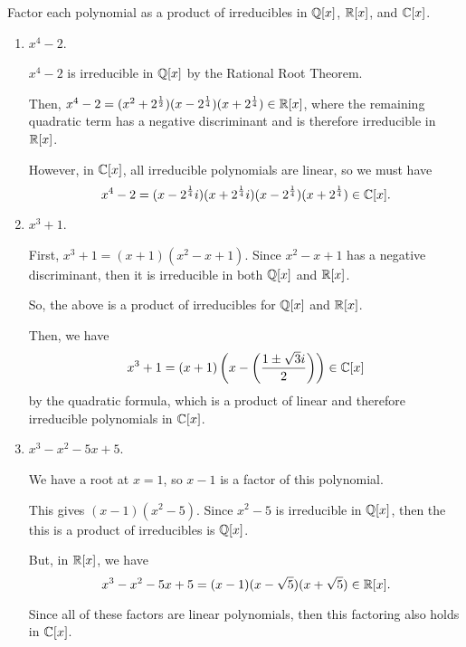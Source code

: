 \documentclass[../hw6]{subfiles}
\begin{document}
\begin{problem}
Factor each polynomial as a product of irreducibles in $\mathbb{Q}[x]$, $\mathbb{R}[x]$, and $\mathbb{C}[x]$.
\end{problem}
\begin{enumerate}[label=\alph*)]
	\item $x^4-2$.

	      $x^4-2$ is irreducible in  $\mathbb{Q}[x]$ by the Rational Root Theorem.

	      Then, $x^4-2=(x^2+2^{\frac{1}{2}})(x-2^{\frac{1}{4}})(x+2^{\frac{1}{4}}) \in \mathbb{R}[x]$,
	      where the remaining quadratic term has a negative discriminant and is therefore irreducible in $\mathbb{R}[x]$.

	      However, in $\mathbb{C}[x]$, all irreducible polynomials are linear, so we must have \[
		      x^4-2=(x-2^{\frac{1}{4}}i)(x+2^{\frac{1}{4}}i)(x-2^{\frac{1}{4}})(x+2^{\frac{1}{4}}) \in  \mathbb{C}[x]
		      .\]

	\item $x^3+1$.

	      First, $x^3+1=(x+1)(x^2-x+1)$. Since $x^2-x+1$ has a negative discriminant, then it is irreducible in both $\mathbb{Q}[x]$ and $\mathbb{R}[x]$.

	      So, the above is a product of irreducibles for $\mathbb{Q}[x]$ and $\mathbb{R}[x]$.

	      Then, we have \[
		      x^3+1 = (x+1)\left( x- \left( \frac{1 \pm \sqrt{3}i }{2} \right)  \right) \in \mathbb{C}[x]
	      \] by the quadratic formula, which is a product of linear and therefore irreducible polynomials in $\mathbb{C}[x]$.

	\item $x^3 - x^2 - 5x + 5$.

	      We have a root at $x=1$, so  $x-1$ is a factor of this polynomial.

	      This gives $(x-1)(x^2-5)$.
	      Since $x^2-5$ is irreducible in $\mathbb{Q}[x]$, then the this is a product of irreducibles is  $\mathbb{Q}[x]$.

	      But, in $\mathbb{R}[x]$, we have \[
		      x^3 - x^2  - 5x + 5 = (x-1)(x-\sqrt{5} )(x + \sqrt{5} )\in \mathbb{R}[x]
		      .\]

	      Since all of these factors are linear polynomials, then this factoring also holds in $\mathbb{C}[x]$.
\end{enumerate}
\end{document}
